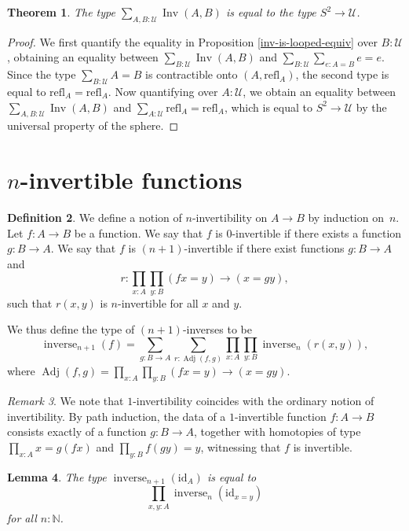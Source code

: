 \documentclass{article}
\theoremstyle{plain}
\newtheorem{theorem}{Theorem}
\newtheorem{lemma}[theorem]{Lemma}
\theoremstyle{definition}
\newtheorem{definition}[theorem]{Definition}
\theoremstyle{remark}
\newtheorem{remark}[theorem]{Remark}
\newcommand{\id}{\mathrm{id}}
\newcommand{\refl}{\mathrm{refl}}
\newcommand{\sphere}{S^{2}}
\newcommand{\U}{\mathcal{U}}
\newcommand{\N}{\mathbb{N}}
\DeclareMathOperator{\inv}{Inv}
\DeclareMathOperator{\inverse}{inverse}
\DeclareMathOperator{\adj}{Adj}
\newcommand{\ninverse}[1]{\inverse_{#1}}
\begin{document}
\begin{theorem}
  The type \(\sum_{A, B : \U}\inv(A, B)\) is equal to the type \(\sphere \to \U\).
\end{theorem}

\begin{proof}
  We first quantify the equality in Proposition
  \ref{inv-is-looped-equiv} over \(B : \U\), obtaining an equality between
  \(\sum_{B : \U}\inv(A, B)\) and \(\sum_{B : \U}\sum_{e : A = B}e = e\).
  Since the type \(\sum_{B : \U}A = B\) is contractible onto
  \(\left(A, \refl_{A}\right)\), the second type is equal to
  \(\refl_{A} = \refl_{A}\). Now quantifying
  over \(A : \U\), we obtain an equality between \(\sum_{A, B : \U}\inv(A, B)\) and
  \(\sum_{A : \U}\refl_{A} = \refl_{A}\), which is equal to \(\sphere \to \U\) by the
  universal property of the sphere.
\end{proof}

\section{\(n\)-invertible functions}

\begin{definition}
  We define a notion of \(n\)-invertibility on \(A \to B\) by induction on~\(n\).
  Let \(f : A \to B\) be a function. We say that \(f\) is
  \(0\)-invertible if there exists a function \(g : B \to A\).
  We say that \(f\) is \((n + 1)\)-invertible if there exist functions \(g : B \to A\) and
  \[r : \prod_{x : A}\prod_{y : B}(f x = y) \to (x = g y),\]
  such that \(r(x, y)\) is \(n\)-invertible for all \(x\) and \(y\).

  We thus define the type of \((n + 1)\)-inverses to be
  \[\ninverse{n + 1}(f) =
    \sum_{g : B \to A}\sum_{r : \adj(f, g)}
    \prod_{x : A}\prod_{y : B}\ninverse{n}(r(x, y)),\]
  where \(\adj(f, g) = \prod_{x : A}\prod_{y : B}(f x = y) \to (x = g y)\).
\end{definition}

\begin{remark}
  We note that \(1\)-invertibility coincides with the ordinary notion of invertibility.
  By path induction, the data of a \(1\)-invertible function \(f : A \to B\)
  consists exactly of a function \(g : B \to A\), together with homotopies of type
  \(\prod_{x : A} x = g(f x)\) and \(\prod_{y : B} f(g y) = y\), witnessing
  that \(f\) is invertible.
\end{remark}

\begin{lemma}
  The type \(\ninverse{n + 1}(\id_{A})\) is equal to
  \[\prod_{x, y : A}\ninverse{n}(\id_{x = y})\]
  for all \(n : \N\).
\end{lemma}
\end{document}
